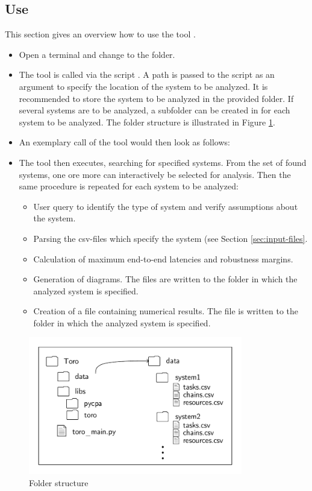 \subsection{Use}
This section gives an overview how to use the tool \Tool.
\begin{itemize}
\item Open a terminal and change to the  folder.	
\item The tool \Tool is called via the script .
A path is passed to the script as an argument to specify the location of the system to be analyzed.
It is recommended to store the system to be analyzed in the provided  folder.
If several systems are to be analyzed, a subfolder can be created in  for each system to be analyzed. 
The folder structure is illustrated in Figure \ref{fig:structure}.
\item An exemplary call of the tool would then look as follows:
\begin{tcolorbox}
\end{tcolorbox}
%
\item The tool \Tool then executes, searching for specified systems. 
From the set of found systems, one ore more can interactively be selected for analysis.
Then the same procedure is repeated for each system to be analyzed:
\begin{itemize}
	\item User query to identify the type of system and verify assumptions about the system.
	\item Parsing the csv-files which specify the system (see Section \ref{sec:input-files}.
	\item Calculation of maximum end-to-end latencies and robustness margins.
	\item Generation of diagrams. The files are written to the folder in which the analyzed system is specified.
	\item Creation of a file containing numerical results.  
	The file is written to the folder in which the analyzed system is specified.
\end{itemize}
\end{itemize}
%
\begin{figure}[t]
		\centering
				\includegraphics[trim=0.5cm 0.5cm 0.5cm 0.5cm, height=6cm]{fig/structure.pdf}
		\caption{Folder structure}
		\label{fig:structure}
\end{figure}
%



